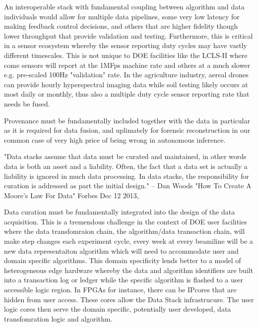 \documentclass{article}
\begin{document}
An interoperable stack with fundamental coupling between algorithm and data individuals would allow for multiple data pipelines, some very low latency for making feedback control decisions, and others that are higher fidelity though lower throughput that provide validation and testing.  Furthermore, this is critical in a sensor ecosystem whereby the sensor reporting duty cycles may have vastly different timescales. 
This is not unique to DOE facilities like the LCLS-II where come sensors will report at the 1MFps machine rate and others at a much slower e.g. pre-scaled 100Hz "validation" rate.  
In the agriculture industry, aereal drones can provide hourly hyperspectral imaging data while soil testing likely occurs at most daily or monthly, thus also a multiple duty cycle sensor reporting rate that needs be fused.

Provenance must be fundamentally included together with the data in particular as it is required for data fusion, and uplimately for forensic reconstruction in our common case of very high price of being wrong in autonomous inference.

"Data stacks assume that data must be curated and maintained, in other words data is both
an asset and a liability. Often, the fact that a data set is actually a liability is ignored in
much data processing. In data stacks, the responsibility for curation is addressed as part
the initial design." -- Dan Woods "How To Create A Moore's Law For Data" Forbes Dec 12 2013, \cite{Woods2013} %

Data curation must be fundamentally integrated into the design of the data acquisition.  This is a tremendous challenge in the context of DOE user facilities where the data transfomraion chain, the algorithm/data transaction chain, will make step changes each experiment cycle, every week at every beamiline will be a new data representaiton algorithm which will need to accommodate user and domain specific algorithms.
This domain specificity lends better to a model of heterogeneous edge hardware whereby the data and algorithm identifiers are built into a transaction log or ledger while the specific algorithm is flashed to a user accessible logic region.
In FPGAs for instance, there can be IPcores that are hidden from user access.  These cores allow the Data Stack infrastrucure.  The user logic cores then serve the domain specific, potentially user developed, data transfomration logic and algorithm.
\end{document}

